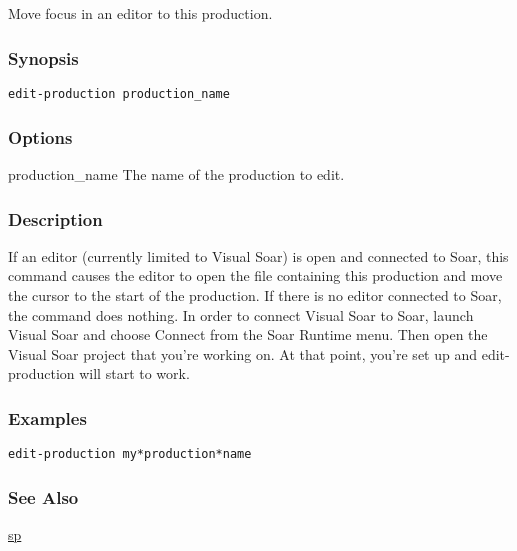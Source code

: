 \subsection{}
\label{edit-production}
Move focus in an editor to this production. 
\subsubsection*{Synopsis}
\begin{verbatim}
edit-production production_name
\end{verbatim}
\subsubsection*{Options}
 production\_name The name of the production to edit. 
\subsubsection*{Description}
 If an editor (currently limited to Visual Soar) is open and connected to Soar, this command causes the editor to open the file containing this production and move the cursor to the start of the production. If there is no editor connected to Soar, the command does nothing. In order to connect Visual Soar to Soar, launch Visual Soar and choose Connect from the Soar Runtime menu. Then open the Visual Soar project that you're working on. At that point, you're set up and edit-production will start to work. 
\subsubsection*{Examples}
\begin{verbatim}
edit-production my*production*name
\end{verbatim}
\subsubsection*{See Also}
\hyperref[sp]{sp} 